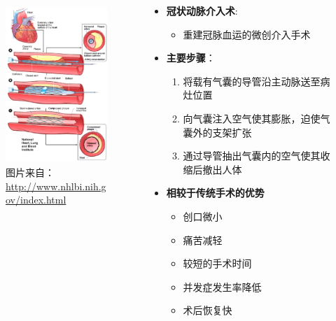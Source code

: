 \begin{frame}
\begin{columns}[onlytextwidth]
\begin{column}{0.4\textwidth}
\begin{figure}[t]
\includegraphics[height=170pt]{../../Figures/background/phauthuatmachmau_stent.eps}
\caption[冠状动脉介入术]{图片来自：\\\url{http://www.nhlbi.nih.gov/index.html}}
\end{figure}
\end{column}
\begin{column}{0.5\textwidth}
\begin{itemize}
\item \textbf{冠状动脉介入术}: 
\begin{itemize}
\item \footnotesize{重建冠脉血运的微创介入手术}
\end{itemize}
\item \textbf{主要步骤}：
\begin{enumerate}[A]
\item \footnotesize{将载有气囊的导管沿主动脉送至病灶位置}
\item \footnotesize{向气囊注入空气使其膨胀，迫使气囊外的支架扩张}
\item \footnotesize{通过导管抽出气囊内的空气使其收缩后撤出人体}
\end{enumerate}
\end{itemize}
\begin{itemize}
\pause \item \textbf{相较于传统手术的优势}
\begin{itemize}
\item 创口微小
\item 痛苦减轻
\item 较短的手术时间
\item 并发症发生率降低
\item 术后恢复快
\end{itemize}
\end{itemize}
\end{column}
\end{columns}
\end{frame}

